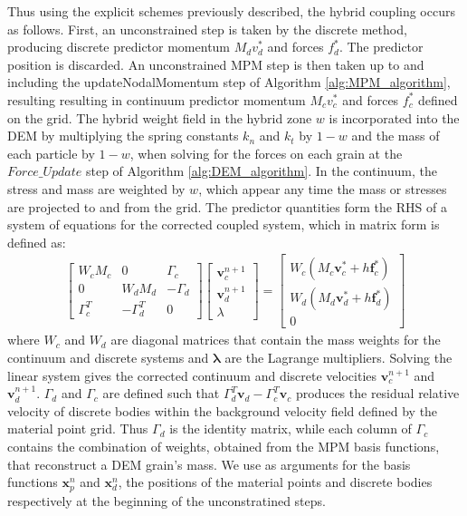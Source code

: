 Thus using the explicit schemes previously described, the hybrid coupling occurs as follows. First, an unconstrained step is taken by the discrete method, producing discrete predictor momentum $M_dv^*_d$ and forces $f^*_d$. The predictor position is discarded. An unconstrained MPM step is then taken up to and including the updateNodalMomentum step of Algorithm \ref{alg:MPM_algorithm}, resulting  resulting in continuum predictor momentum $M_cv^*_c$ and forces $f^*_c$ defined on the grid. The hybrid weight field in the hybrid zone $w$ is incorporated into the DEM by multiplying the spring constants $k_n$ and $k_t$ by $1-w$ and the mass of each particle by $1-w$, when solving for the forces on each grain at the $Force\_Update$ step of Algorithm \ref{alg:DEM_algorithm}. In the continuum, the stress and mass are weighted by $w$, which appear any time the mass or stresses are projected to and from the grid. The predictor quantities form the RHS of a system of equations for the corrected coupled system, which in matrix form is defined as:
\begin{align}
\begin{bmatrix}
    W_c M_c & 0 & \Gamma_c \\
    0 & W_d M_d & -\Gamma_d \\
    \Gamma_c^T & -\Gamma_d^T & 0
\end{bmatrix}
\begin{bmatrix}
    \bm{v}_c^{n+1} \\
    \bm{v}_d^{n+1} \\
    \lambda
\end{bmatrix}
=
\begin{bmatrix}
    W_c \left( M_c \bm{v}^*_c + h \bm{f}^*_c \right) \\
    W_d \left( M_d \bm{v}^*_d + h \bm{f}^*_d \right) \\
    0
\end{bmatrix}
\label{eq:coupled_system}
\end{align}
where $W_c$ and $W_d$ are diagonal matrices that contain the mass weights for the continuum and discrete systems and $\bm{\lambda}$ are the Lagrange multipliers. Solving the linear system gives the corrected continuum and discrete velocities $\bm{v}_c^{n+1}$ and $\bm{v}_d^{n+1}$.
$\Gamma_d$ and $\Gamma_c$ are defined such that
$\Gamma_d^T \bm{v}_d - \Gamma_c^T \bm{v}_c$ produces the residual relative velocity of discrete bodies within the background
velocity field defined by the material point grid. Thus $\Gamma_d$ is the identity matrix,
while each column of $\Gamma_c$ contains the combination of weights, obtained from the MPM basis functions, that reconstruct a DEM grain's mass. We use as arguments for the basis functions $\bm{x}^n_p$ and $\bm{x}^n_d$, the positions of the material points and discrete bodies respectively at the beginning of the unconstratined steps.

